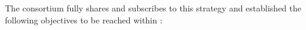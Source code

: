 


The consortium fully shares and subscribes to this strategy and established the following objectives to be reached within \Project{}:

